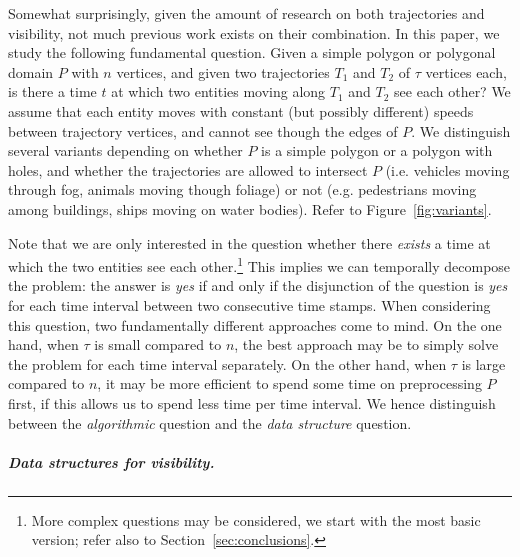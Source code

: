 \documentclass[a4paper, UKenglish]{lipics-v2018}
\begin{document}
Somewhat surprisingly, given the amount of research on both trajectories and visibility, not much previous work exists on their combination.
%
In this paper, we study the following fundamental question.
  Given a simple polygon or polygonal domain $P$ with $n$ vertices, and given two trajectories $T_1$ and $T_2$ of $\tau$ vertices each, is there a time $t$ at which two entities moving along $T_1$ and $T_2$ see each other?
  We assume that each entity moves with constant (but possibly different) speeds between trajectory vertices, and cannot see though the edges of $P$.
  We distinguish several variants depending on whether $P$ is a simple polygon or a polygon with holes, and whether the trajectories are allowed to intersect $P$ (i.e. vehicles moving through fog, animals moving though foliage) or not (e.g. pedestrians moving among buildings, ships moving on water bodies). Refer to Figure~\ref {fig:variants}.
    


Note that we are only interested in the question whether there {\em exists} a time at which the two entities see each other.\footnote {More complex questions may be considered, we start with the most basic version; refer also to Section~\ref {sec:conclusions}.} 
This implies we can temporally decompose the problem: the answer is {\em yes} if and only if the disjunction of the question is {\em yes} for each time interval between two consecutive time stamps.
When considering this question, two fundamentally different approaches come to mind. On the one hand, when $\tau$ is small compared to $n$, the best approach may be to simply solve the problem for each time interval separately. On the other hand, when $\tau$ is large compared to $n$, it may be more efficient to spend some time on preprocessing $P$ first, if this allows us to spend less time per time interval.
We hence distinguish between the {\em algorithmic} question and the {\em data structure} question.

\subparagraph {Data structures for visibility.}
\end{document}
